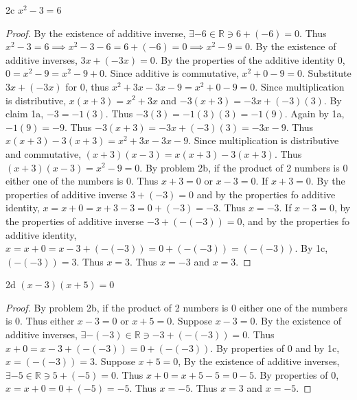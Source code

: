 \documentclass{article}
\newcommand{\R}{\mathbb{R}}
\begin{document}
\begin{PROB}{2c}\label{Problem 2c.}
    $x^2 - 3 = 6$
\end{PROB}
\begin{proof}
    By the existence of additive inverse, $\exists -6 \in \R \ni 6 + (-6) = 0$. Thus $x^2 - 3 = 6 \implies x^2 - 3 -6 = 6 + (-6) = 0 \implies x^2 - 9 = 0$. By the existence of additive inverses, $3x + (-3x) = 0$. By the properties of the additive identity 0, $0 = x^2 - 9 = x^2 - 9 + 0$. Since additive is commutative, $x^2 + 0 - 9 = 0$. Substitute $3x + (-3x)$ for 0, thus $x^2 + 3x -3x - 9 = x^2 + 0 - 9 = 0$. Since multiplication is distributive, $x(x + 3) = x^2 + 3x$ and $-3(x + 3) = -3x + (-3)(3)$. By claim 1a, $-3 = -1(3)$. Thus $-3(3)= -1(3)(3) = -1(9)$. Again by 1a, $-1(9) = -9$. Thus $-3(x + 3) = -3x + (-3)(3) = -3x- 9$. Thus $x(x+3) - 3(x+3) = x^2 + 3x - 3x - 9$. Since multiplication is distributive and commutative, $(x+3)(x - 3) = x(x + 3) - 3(x+3)$. Thus $(x+3)(x-3) = x^2 - 9 = 0$. By problem 2b, if the product of 2 numbers is 0 either one of the numbers is 0. Thus $x+ 3 = 0$ or $x-3 = 0$. If $x + 3 = 0$. By the properties of additive inverse $3 + (-3) = 0$ and by the properties fo additive identity, $x = x+0 = x + 3 - 3 = 0 +(-3) = -3$. Thus $x = -3$. If $x -3 = 0$, by the properties of additive inverse $-3 + (-(-3)) = 0$, and by the properties fo additive identity, $x = x+0 = x - 3 + (-(-3)) = 0 +(-(-3)) = (-(-3))$. By 1c, $(-(-3)) = 3$. Thus $x = 3$. Thus $x = -3$ and $x=3$.                                
\end{proof}
\begin{PROB}{2d}\label{Problem 2d.}
    $(x - 3)(x + 5) = 0$ 
\end{PROB}
\begin{proof}
    By problem 2b, if the product of 2 numbers is 0 either one of the numbers is 0. Thus either $x - 3 = 0$ or $x + 5 = 0$. Suppose $x - 3 = 0$. By the existence of additive inverses, $\exists -(-3) \in \R \ni -3 + (-(-3)) = 0$. Thus $x + 0 = x - 3 + (-(-3)) = 0 + (-(-3))$. By properties of 0 and by 1c, $x = (-(-3)) = 3$. Suppose $x + 5 = 0$, By the existence of additive inverses, $\exists -5 \in \R \ni 5 + (- 5) = 0$. Thus $x + 0 = x + 5 -5 = 0 -5$. By properties of 0, $x = x + 0 = 0 + (-5) =-5$. Thus $x=-5$. Thus $x =3$ and $x = -5$.      
\end{proof}

\bigskip
\end{document}
